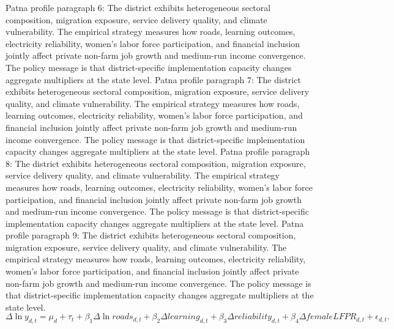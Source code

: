 \documentclass[preprint,12pt]{elsarticle}
\begin{document}
Patna profile paragraph 6: The district exhibits heterogeneous sectoral composition, migration exposure, service delivery quality, and climate vulnerability. The empirical strategy measures how roads, learning outcomes, electricity reliability, women's labor force participation, and financial inclusion jointly affect private non-farm job growth and medium-run income convergence. The policy message is that district-specific implementation capacity changes aggregate multipliers at the state level.
Patna profile paragraph 7: The district exhibits heterogeneous sectoral composition, migration exposure, service delivery quality, and climate vulnerability. The empirical strategy measures how roads, learning outcomes, electricity reliability, women's labor force participation, and financial inclusion jointly affect private non-farm job growth and medium-run income convergence. The policy message is that district-specific implementation capacity changes aggregate multipliers at the state level.
Patna profile paragraph 8: The district exhibits heterogeneous sectoral composition, migration exposure, service delivery quality, and climate vulnerability. The empirical strategy measures how roads, learning outcomes, electricity reliability, women's labor force participation, and financial inclusion jointly affect private non-farm job growth and medium-run income convergence. The policy message is that district-specific implementation capacity changes aggregate multipliers at the state level.
Patna profile paragraph 9: The district exhibits heterogeneous sectoral composition, migration exposure, service delivery quality, and climate vulnerability. The empirical strategy measures how roads, learning outcomes, electricity reliability, women's labor force participation, and financial inclusion jointly affect private non-farm job growth and medium-run income convergence. The policy message is that district-specific implementation capacity changes aggregate multipliers at the state level.
\begin{equation}\Delta \ln y_{d,t}=\mu_d+\tau_t+\beta_1\Delta\ln roads_{d,t}+\beta_2\Delta learning_{d,t}+\beta_3\Delta reliability_{d,t}+\beta_4\Delta femaleLFPR_{d,t}+\epsilon_{d,t}.\end{equation}
\end{document}

